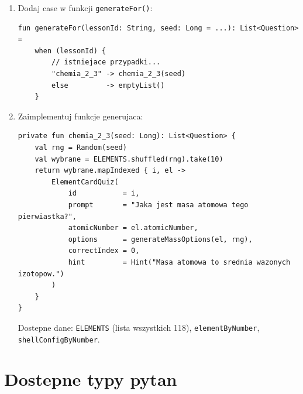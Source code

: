 \documentclass[a4paper,11pt]{article}
\begin{document}
\begin{enumerate}
  \item Dodaj case w funkcji \texttt{generateFor()}:
\begin{lstlisting}
fun generateFor(lessonId: String, seed: Long = ...): List<Question> =
    when (lessonId) {
        // istniejace przypadki...
        "chemia_2_3" -> chemia_2_3(seed)
        else         -> emptyList()
    }
\end{lstlisting}

  \item Zaimplementuj funkcje generujaca:
\begin{lstlisting}
private fun chemia_2_3(seed: Long): List<Question> {
    val rng = Random(seed)
    val wybrane = ELEMENTS.shuffled(rng).take(10)
    return wybrane.mapIndexed { i, el ->
        ElementCardQuiz(
            id           = i,
            prompt       = "Jaka jest masa atomowa tego pierwiastka?",
            atomicNumber = el.atomicNumber,
            options      = generateMassOptions(el, rng),
            correctIndex = 0,
            hint         = Hint("Masa atomowa to srednia wazonych izotopow.")
        )
    }
}
\end{lstlisting}

  Dostepne dane: \texttt{ELEMENTS} (lista wszystkich 118), \texttt{elementByNumber}, \texttt{shellConfigByNumber}.
\end{enumerate}

\section{Dostepne typy pytan}
\end{document}
